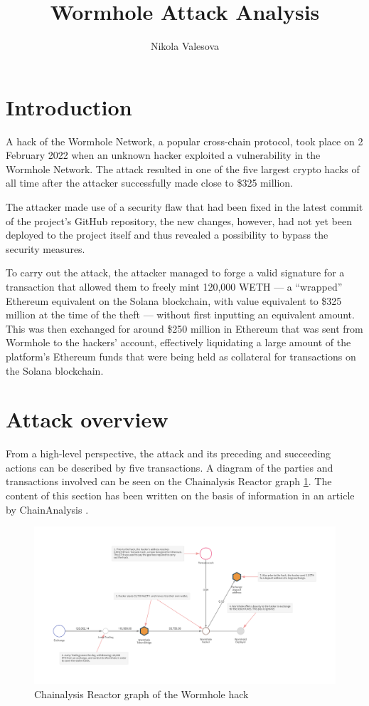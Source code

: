 \documentclass{article}
\title{Wormhole Attack Analysis}
\author{Nikola Valesova}
\begin{document}
\maketitle

\section{Introduction}

A hack of the Wormhole Network, a popular cross-chain protocol, took place on 2 February 2022 when an unknown hacker exploited a vulnerability in the Wormhole Network. The attack resulted in one of the five largest crypto hacks of all time after the attacker successfully made close to \$325 million. \cite{chainanalysis}

The attacker made use of a security flaw that had been fixed in the latest commit of the project's GitHub repository, the new changes, however, had not yet been deployed to the project itself and thus revealed a possibility to bypass the security measures. \cite{the_verge}

To carry out the attack, the attacker managed to forge a valid signature for a transaction that allowed them to freely mint 120,000 WETH — a “wrapped” Ethereum equivalent on the Solana blockchain, with value equivalent to \$325 million at the time of the theft — without first inputting an equivalent amount. This was then exchanged for around \$250 million in Ethereum that was sent from Wormhole to the hackers’ account, effectively liquidating a large amount of the platform’s Ethereum funds that were being held as collateral for transactions on the Solana blockchain. \cite{the_verge}

\section{Attack overview}

From a high-level perspective, the attack and its preceding and succeeding actions can be described by five transactions. A diagram of the parties and transactions involved can be seen on the Chainalysis Reactor graph \ref{fig:reactor_graph}. The content of this section has been written on the basis of information in an article by ChainAnalysis \cite{chainanalysis}.

\begin{figure}[ht!]
\centering
\includegraphics[width=\textwidth]{img/Wormhole_hack.png}
\caption{\label{fig:reactor_graph}Chainalysis Reactor graph of the Wormhole hack}
\end{figure}
\end{document}
